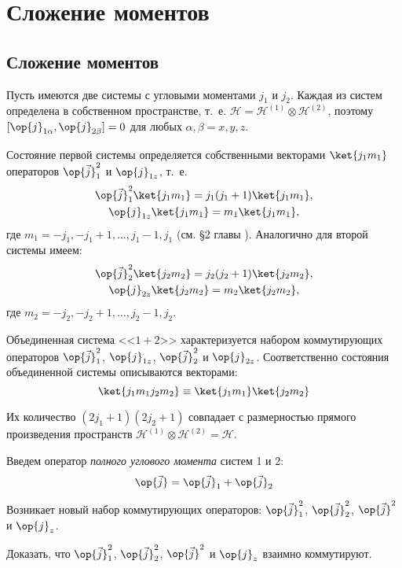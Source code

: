 \chapter{Сложение моментов}

\section{Сложение моментов}

Пусть имеются две системы с угловыми моментами $j_1$ и $j_2$. Каждая из систем определена в собственном пространстве, т.~е. $\mathcal{H} = \mathcal{H}^{(1)} \otimes \mathcal{H}^{(2)}$, поэтому $[\op{j}_{1 \alpha}, \op{j}_{2 \beta}] = 0$ для любых $\alpha, \beta = x, y, z$.

Состояние первой системы определяется собственными векторами $\ket{j_1 m_1}$ операторов $\op{\vec{j}}_1^2$ и $\op{j}_{1z}$, т.~е.
\begin{gather*}
\op{\vec{j}}_1^2\ket{j_1 m_1} = j_1(j_1 + 1)\ket{j_1 m_1},  \\
\op{j}_{1z} \ket{j_1 m_1} = m_1\ket{j_1 m_1},
\end{gather*}
где $m_1 = -j_1, -j_1 + 1, \dots , j_1 - 1, j_1$ (см. \S 2 главы ). Аналогично для второй системы имеем:
\begin{gather*}
\op{\vec{j}}_2^2\ket{j_2 m_2} = j_2(j_2 + 1)\ket{j_2 m_2},  \\
\op{j}_{2z} \ket{j_2 m_2} = m_2\ket{j_2 m_2}, 
\end{gather*}
где $m_2 = -j_2, -j_2 + 1, \dots , j_2 - 1, j_2$.

Объединенная система <<$1 + 2$>> характеризуется набором коммутирующих операторов $\op{\vec{j}}_1^2$, $\op{j}_{1z}$, $\op{\vec{j}}_2^2$ и $\op{j}_{2z}$. Соответственно состояния объединенной системы описываются векторами:
$$
\ket{j_1 m_1 j_2 m_2} \equiv \ket{j_1 m_1} \ket{j_2 m_2} 
$$

Их количество $(2j_1 + 1)(2j_2 + 1)$ совпадает с размерностью прямого произведения пространств $\mathcal{H}^{(1)} \otimes \mathcal{H}^{(2)} = \mathcal{H}$.

Введем оператор {\em полного углового момента} систем 1 и 2:
$$
\op{\vec{j}} = \op{\vec{j}}_1 + \op{\vec{j}}_2
$$

Возникает новый набор коммутирующих операторов: $\op{\vec{j}}_1^2$, $\op{\vec{j}}_2^2$, $\op{\vec{j}}^2$ и $\op{j}_{z}$.
\begin{excr}
Доказать, что $\op{\vec{j}}_1^2$, $\op{\vec{j}}_2^2$, $\op{\vec{j}}^2$ и $\op{j}_{z}$ взаимно коммутируют.
\end{excr}

